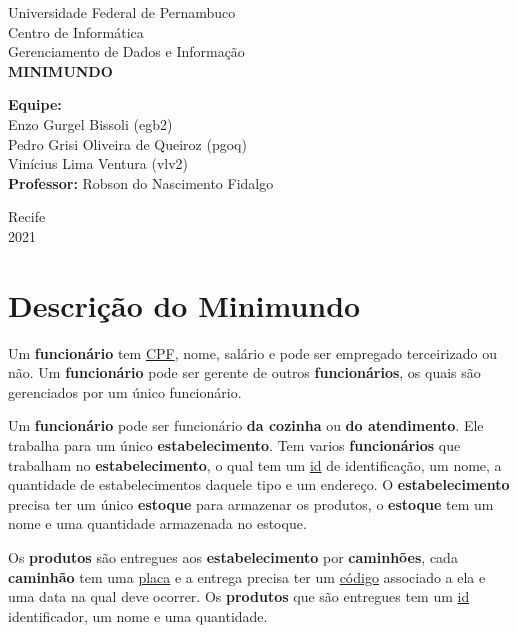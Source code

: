 \documentclass[12pt, a4paper]{article}
\begin{document}
\begin{titlepage}
\begin{center}
{\large Universidade Federal de Pernambuco}\\[0.2cm]
{\large Centro de Informática}\\[0.2cm]
{\large Gerenciamento de Dados e Informação}\\[3.7cm]
{\bf \huge MINIMUNDO}\\[5.cm]
\end{center}
{\large {\bf Equipe:}\\[0.2cm]
Enzo Gurgel Bissoli (egb2)\\[0.2cm]
Pedro Grisi Oliveira de Queiroz (pgoq)\\[0.2cm]
Vinícius Lima Ventura (vlv2)\\[0.2cm]}
{\large {\bf Professor:} Robson do Nascimento Fidalgo}\\[2cm]
\begin{center}
{\large Recife}\\[0.2cm]
{\large 2021}\\[0.2cm]
\end{center}
\end{titlepage}
\onehalfspacing
\section{Descrição do Minimundo}

Um \textbf{funcionário} tem \underline{CPF}, nome, salário e pode ser empregado terceirizado ou não.  Um \textbf{funcionário} pode ser gerente de outros \textbf{funcionários}, os quais são gerenciados por um único funcionário.

Um \textbf{funcionário} pode ser funcionário \textbf{da cozinha} ou \textbf{do atendimento}. Ele trabalha para um único \textbf{estabelecimento}. Tem varios \textbf{funcionários} que trabalham no \textbf{estabelecimento}, o qual tem um \underline{id} de identificação, um nome, a quantidade de estabelecimentos daquele tipo e um endereço. O \textbf{estabelecimento} precisa ter um único \textbf{estoque} para armazenar os produtos, o \textbf{estoque} tem um nome e uma quantidade armazenada no estoque.

Os \textbf{produtos} são entregues aos \textbf{estabelecimento} por \textbf{caminhões}, cada \textbf{caminhão} tem uma \underline{placa} e a entrega precisa ter um \underline{código} associado a ela e uma data na qual deve ocorrer. Os \textbf{produtos} que são entregues tem um \underline{id} identificador, um nome e uma quantidade.
\end{document}
